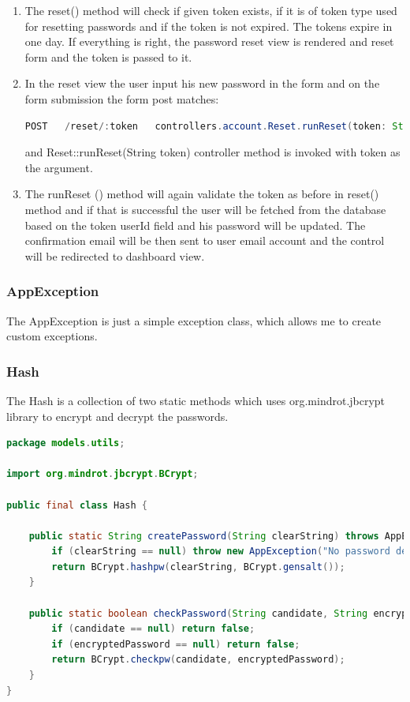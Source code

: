 \documentclass[12pt,twoside,a4paper]{report}
\begin{document}
\begin{enumerate}
\item The reset() method will check if given token exists, if it is of token type used for resetting passwords and if the token is not expired. The tokens expire in one day. If everything is right, the password reset view is rendered and reset form and the token is passed to it.

\item In the reset view the user input his new password in the form and on the form submission the form post matches:
\begin{lstlisting}[language=java]
 POST   /reset/:token   controllers.account.Reset.runReset(token: String)
\end{lstlisting}
and Reset::runReset(String token) controller method is invoked with token as the argument.

\item The runReset () method will again validate the token as before in reset() method and if that is successful the user will be fetched from the database based on the token userId field and his password will be updated. The confirmation email will be then sent to user email account and the control will be redirected to dashboard view.
\end{enumerate}

\subsubsection{AppException}
The AppException is just a simple exception class, which allows me to create custom exceptions.

\subsubsection{Hash}
The Hash is a collection of two static methods which uses org.mindrot.jbcrypt\cite{35} library to encrypt and decrypt the passwords.

\begin{lstlisting}[language=java]
 package models.utils;

import org.mindrot.jbcrypt.BCrypt;

public final class Hash {

    public static String createPassword(String clearString) throws AppException {
        if (clearString == null) throw new AppException("No password defined!");
        return BCrypt.hashpw(clearString, BCrypt.gensalt());
    }

    public static boolean checkPassword(String candidate, String encryptedPassword) {
        if (candidate == null) return false;
        if (encryptedPassword == null) return false;
        return BCrypt.checkpw(candidate, encryptedPassword);
    }
}
\end{lstlisting}
\end{document}
